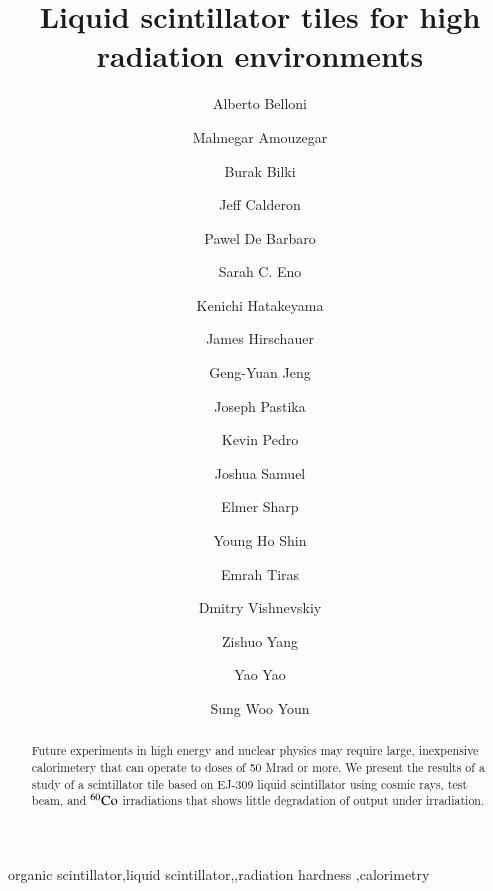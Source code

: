\documentclass[review]{elsarticle}
\begin{document}
\begin{frontmatter}

\title{Liquid scintillator tiles for high radiation environments }


\author[umd]{Alberto Belloni}
\author[umd]{Mahnegar Amouzegar}
\author[iowa]{Burak Bilki}
\author[umd]{Jeff Calderon}
\author[rochester]{Pawel De Barbaro}
\author[umd]{Sarah C. Eno}
\author[baylor]{Kenichi Hatakeyama}
\author[fnal]{James Hirschauer}
\author[umd]{Geng-Yuan Jeng}
\author[baylor]{Joseph Pastika}
\author[fnal]{Kevin Pedro}
\author[umd]{Joshua Samuel}
\author[elmer]{Elmer Sharp}
\author[umd]{Young Ho Shin}
\author[baylor]{Emrah Tiras}
\author[rochester]{Dmitry Vishnevskiy}
\author[umd]{Zishuo Yang}
\author[umd]{Yao Yao}
\author[korea]{Sung Woo Youn}




\address[umd]{Dept. Physics, U. Maryland, College Park MD 30742 USA}
\address[eljen]{Eljen Technology, 1300 W. Broadway, Sweetwater, Tx 79556 USA}
\address[korea]{Institute for Basic Science, Center for Axion and Precision Physics Research, IBS Center for Axion and Precision Physics Research
Room 4315, Department of Physics, Natural Science Building (E6-2), KAIST,
291 Daehak-ro, Yuseong-gu, Daejeon 305-701, South Korea}
\address[elmer]{Elmer Sharp Engineering, 7007 Leesville Blvd. Springfield, VA 22151}
\address[fnal]{Fermi National Accelerator Laboratory, Batavia, IL, USA}
\address[baylor]{Baylor University, Waco, Texas, USA}
\address[iowa]{The University of Iowa, Iowa City, IA, USA}
\address[rochester]{The University of Rochester, Rochester, NY, USA}

\begin{abstract}
Future experiments in high energy and nuclear physics may require
large, inexpensive calorimetery that can operate to doses of 50 Mrad
or more.  We present the results of a study of a scintillator tile
based on EJ-309 liquid scintillator using cosmic rays, test beam, and
$\rm{^{60}Co}$ irradiations that shows little degradation of output
under irradiation.
\end{abstract}

\begin{keyword}
organic scintillator\sep liquid scintillator\sep \sep radiation
hardness \sep calorimetry
\end{keyword}

\end{frontmatter}
\end{document}
